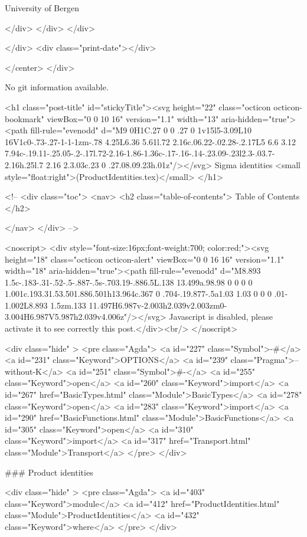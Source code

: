                   University of Bergen
                
                </div>
            </div>
          </div>
          
          
        </div>
        <div class="print-date"></div>
        
        
    </center>
  </div>

  
  No git information available.
  

  <h1 class="post-title" id="stickyTitle"><svg height="22" class="octicon octicon-bookmark" viewBox="0 0 10 16" version="1.1" width="13" aria-hidden="true"><path fill-rule="evenodd" d="M9 0H1C.27 0 0 .27 0 1v15l5-3.09L10 16V1c0-.73-.27-1-1-1zm-.78 4.25L6.36 5.61l.72 2.16c.06.22-.02.28-.2.17L5 6.6 3.12 7.94c-.19.11-.25.05-.2-.17l.72-2.16-1.86-1.36c-.17-.16-.14-.23.09-.23l2.3-.03.7-2.16h.25l.7 2.16 2.3.03c.23 0 .27.08.09.23h.01z"/></svg> Sigma identities <small style="float:right">(ProductIdentities.tex)</small>
  </h1>

  <!-- 
  <div class="toc">
    <nav>
    <h2 class="table-of-contents"> Table of Contents </h2>
      

    </nav>
  </div>
   -->

  <noscript>
  <div style="font-size:16px;font-weight:700; color:red;"><svg height="18" class="octicon octicon-alert" viewBox="0 0 16 16" version="1.1" width="18" aria-hidden="true"><path fill-rule="evenodd" d="M8.893 1.5c-.183-.31-.52-.5-.887-.5s-.703.19-.886.5L.138 13.499a.98.98 0 0 0 0 1.001c.193.31.53.501.886.501h13.964c.367 0 .704-.19.877-.5a1.03 1.03 0 0 0 .01-1.002L8.893 1.5zm.133 11.497H6.987v-2.003h2.039v2.003zm0-3.004H6.987V5.987h2.039v4.006z"/></svg> Javascript is disabled, please activate it to see correctly this post.</div><br/>
  </noscript>

  <div class="hide" >
<pre class="Agda">
<a id="227" class="Symbol">{-#</a> <a id="231" class="Keyword">OPTIONS</a> <a id="239" class="Pragma">--without-K</a> <a id="251" class="Symbol">#-}</a>
<a id="255" class="Keyword">open</a> <a id="260" class="Keyword">import</a> <a id="267" href="BasicTypes.html" class="Module">BasicTypes</a>
<a id="278" class="Keyword">open</a> <a id="283" class="Keyword">import</a> <a id="290" href="BasicFunctions.html" class="Module">BasicFunctions</a>
<a id="305" class="Keyword">open</a> <a id="310" class="Keyword">import</a> <a id="317" href="Transport.html" class="Module">Transport</a>
</pre>
</div>

### Product identities

<div class="hide" >
<pre class="Agda">
<a id="403" class="Keyword">module</a>
  <a id="412" href="ProductIdentities.html" class="Module">ProductIdentities</a>
  <a id="432" class="Keyword">where</a>
</pre>
</div>


